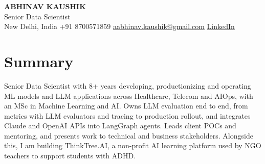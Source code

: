 \documentclass[10pt,a4paper]{article}
\begin{document}
\begin{center}
  {\LARGE\bfseries ABHINAV KAUSHIK}\\[2pt]
  {\large Senior Data Scientist}\\[2pt]
  New Delhi, India \textbar{} +91 8700571859 \textbar{} \href{mailto:aabhinav.kaushik@gmail.com}{aabhinav.kaushik@gmail.com} \textbar{} \href{https://www.linkedin.com/in/abhinav-kaushik10/}{LinkedIn}  
\end{center}

\section{Summary}
Senior Data Scientist with 8+ years developing, productionizing and operating ML models and LLM applications across Healthcare, Telecom and AIOps, with an MSc in Machine Learning and AI. Owns LLM evaluation end to end, from metrics with LLM evaluators and tracing to production rollout, and integrates Claude and OpenAI APIs into LangGraph agents. Leads client POCs and mentoring, and presents work to technical and business stakeholders. Alongside this, I am building ThinkTree.AI, a non-profit AI learning platform used by NGO teachers to support students with ADHD.
\end{document}
